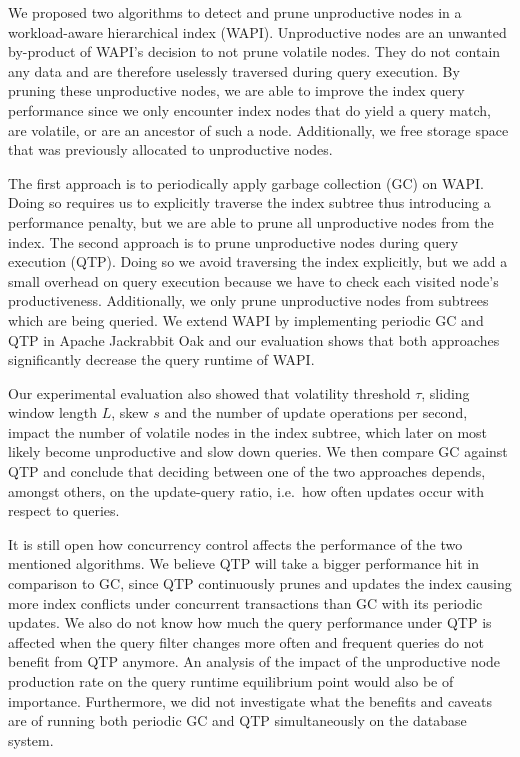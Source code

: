\documentclass[abstracton,12pt]{scrartcl}
\theoremstyle{definition}
\begin{document}
We proposed two algorithms to detect and prune unproductive nodes in a workload-aware
hierarchical index (WAPI). Unproductive nodes are an unwanted by-product of
WAPI's decision to not prune volatile nodes. They do not contain any data
and are therefore uselessly traversed during query execution.
By pruning these unproductive nodes, we are able to improve the
index query performance since we only encounter index nodes that do yield a
query match, are volatile, or are an ancestor of such a node.
Additionally, we free storage space that was previously allocated to unproductive nodes.

The first approach is to periodically apply garbage collection (GC) on WAPI. Doing so
requires us to explicitly traverse the index subtree thus introducing a performance penalty,
but we are able to prune all unproductive nodes from the index.
The second approach is to prune unproductive nodes during query execution (QTP). Doing so we
avoid traversing the index explicitly, but we add a small overhead on query execution
because we have to check each visited node's productiveness.
Additionally, we only prune unproductive nodes from subtrees which are being queried.
We extend WAPI by implementing periodic GC and QTP in Apache Jackrabbit Oak
and our evaluation shows that both approaches significantly decrease the query runtime of WAPI.

Our experimental evaluation also showed that volatility threshold $\tau$, sliding
window length $L$, skew $s$ and the number of update operations per second, impact the number
of volatile nodes in the index subtree, which later on most likely become
unproductive and slow down queries. We then compare GC against QTP and conclude
that deciding between one of the two approaches depends, amongst others, on the update-query
ratio, i.e.\ how often updates occur with respect to queries.

It is still open how concurrency control affects the performance of the two mentioned
algorithms. We believe QTP will take a bigger performance hit in comparison to GC, since
QTP continuously prunes and updates the index causing more index conflicts under
concurrent transactions than GC with its periodic updates. 
We also do not know how much the query performance under QTP is affected when the
query filter changes more often and frequent queries do not benefit
from QTP anymore.
An analysis of the impact of the unproductive node production rate on the
query runtime equilibrium point would also be of importance. 
Furthermore, we did not investigate what the benefits and caveats
are of running both periodic GC and QTP simultaneously on the database system.
\end{document}
